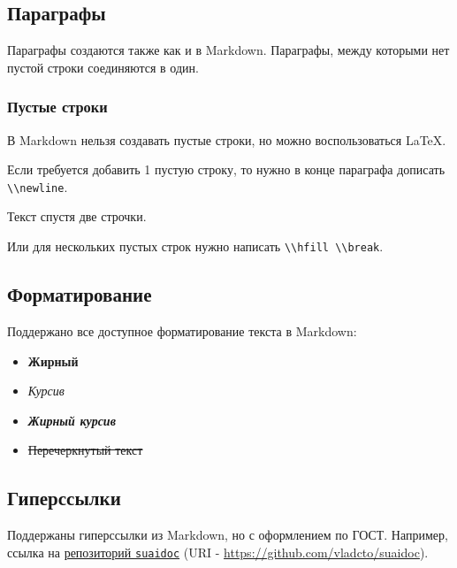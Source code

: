 \documentclass[a4paper]{article}
\let\st\sout
\renewcommand{\emph}[1]{\textit{#1}}
\def\tightlist{}
\newcommand{\passthrough}[1]{{\codefont #1}}
\let\oldhref\href
\renewcommand{\href}[2]{\oldhref{#1}{#2} (URI - \url{#1})}
\begin{document}
\subsection{Параграфы}\label{ux43fux430ux440ux430ux433ux440ux430ux444ux44b}

Параграфы создаются также как и в Markdown. Параграфы, между которыми
нет пустой строки соединяются в один.

\subsubsection{Пустые
строки}\label{ux43fux443ux441ux442ux44bux435-ux441ux442ux440ux43eux43aux438}

В Markdown нельзя создавать пустые строки, но можно воспользоваться
\LaTeX.

Если требуется добавить 1 пустую строку, то нужно в конце параграфа
дописать \passthrough{\lstinline!\\newline!}.\newline

Текст спустя две строчки. \hfill \break \hfill \break

Или для нескольких пустых строк нужно написать
\passthrough{\lstinline!\\hfill \\break!}.

\subsection{Форматирование}\label{ux444ux43eux440ux43cux430ux442ux438ux440ux43eux432ux430ux43dux438ux435}

Поддержано все доступное форматирование текста в Markdown:

\begin{itemize}
\tightlist
\item
  \textbf{Жирный}
\item
  \emph{Курсив}
\item
  \textbf{\emph{Жирный курсив}}
\item
  \st{Перечеркнутый текст}
\end{itemize}

\subsection{Гиперссылки}\label{ux433ux438ux43fux435ux440ux441ux441ux44bux43bux43aux438}

Поддержаны гиперссылки из Markdown, но с оформлением по ГОСТ. Например,
ссылка на \href{https://github.com/vladcto/suaidoc}{репозиторий
\passthrough{\lstinline!suaidoc!}}.
\end{document}
